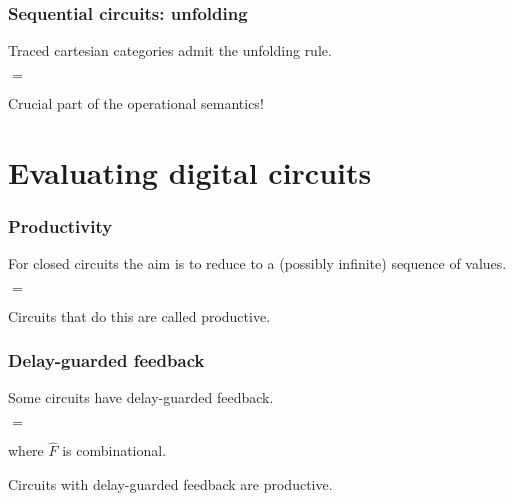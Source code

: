 \documentclass[aspectratio=169]{beamer}
\begin{document}
    \begin{frame}
        \frametitle{Sequential circuits: unfolding}

        \pause

        Traced cartesian categories admit the \alert{unfolding} rule.

        \pause
        \vspace{1em}

        \begin{center}
            \pause
            \quad$=$\quad
        \end{center}

        \pause

        Crucial part of the operational semantics!
    \end{frame}

    \section{Evaluating digital circuits}

    \begin{frame}
        \frametitle{Productivity}
    
        For \alert{closed circuits} the aim is to reduce to a (\alert{possibly infinite}) sequence of values.        

        \pause

        \begin{center}
            \quad$=$\quad
        \end{center}


        \pause

        Circuits that do this are called \alert{productive}.
    
    \end{frame}

    \begin{frame}
        \frametitle{Delay-guarded feedback}
    
        Some circuits have \alert{delay-guarded feedback}.

        \pause

        \begin{center}
            \pause
            \quad$=$\quad
        \end{center}

        where $\hat{F}$ is combinational.

        \pause

        \vspace{1em}
    
        \begin{theorem}
            Circuits with delay-guarded feedback are productive.
        \end{theorem}

    \end{frame}
\end{document}
